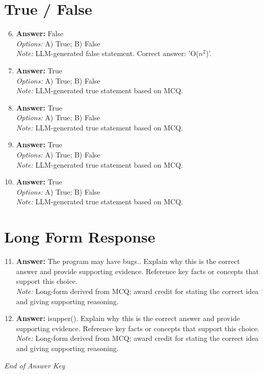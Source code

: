 \documentclass[12pt]{article}
\begin{document}
\section*{True / False}
\begin{enumerate}[label=\arabic*.]
\setcounter{enumi}{5}
\item \textbf{Answer:} False
\\ \textit{Options:} A) True; B) False
\\ \textit{Note:} LLM-generated false statement. Correct answer: 'O($n^2$)'.
\item \textbf{Answer:} True
\\ \textit{Options:} A) True; B) False
\\ \textit{Note:} LLM-generated true statement based on MCQ.
\item \textbf{Answer:} True
\\ \textit{Options:} A) True; B) False
\\ \textit{Note:} LLM-generated true statement based on MCQ.
\item \textbf{Answer:} True
\\ \textit{Options:} A) True; B) False
\\ \textit{Note:} LLM-generated true statement based on MCQ.
\item \textbf{Answer:} True
\\ \textit{Options:} A) True; B) False
\\ \textit{Note:} LLM-generated true statement based on MCQ.
\end{enumerate}

\section*{Long Form Response}
\begin{enumerate}[label=\arabic*.]
\setcounter{enumi}{10}
\item \textbf{Answer:} The program may have bugs.. Explain why this is the correct answer and provide supporting evidence. Reference key facts or concepts that support this choice.
\\ \textit{Note:} Long-form derived from MCQ; award credit for stating the correct idea and giving supporting reasoning.
\item \textbf{Answer:} isupper(). Explain why this is the correct answer and provide supporting evidence. Reference key facts or concepts that support this choice.
\\ \textit{Note:} Long-form derived from MCQ; award credit for stating the correct idea and giving supporting reasoning.
\end{enumerate}

\vfill
\noindent\textit{End of Answer Key}
\end{document}
